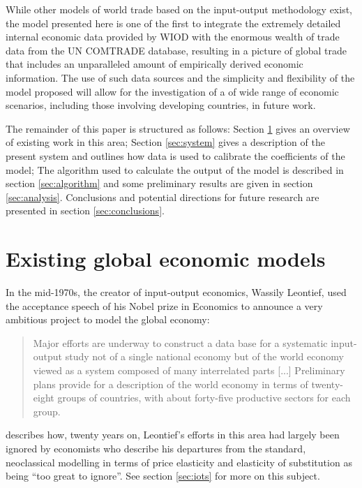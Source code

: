 \documentclass{article}
\begin{document}
While other models of world trade based on the input-output methodology exist, the model presented here is one of the first to integrate the extremely detailed internal economic data provided by WIOD with the enormous wealth of trade data from the UN COMTRADE database, resulting in a picture of global trade that includes an unparalleled amount of empirically derived economic information.
The use of such data sources and the simplicity and flexibility of the model proposed will allow for the investigation of a of wide range of economic scenarios, including those involving developing countries, in future work.

The remainder of this paper is structured as follows: 
Section \ref{sec:litreview} gives an overview of existing work in this area;
Section \ref{sec:system} gives a description of the present system and outlines how data is used to calibrate the coefficients of the model;
The algorithm used to calculate the output of the model is described in section \ref{sec:algorithm} and some preliminary results are given in section \ref{sec:analysis}.
Conclusions and potential directions for future research are presented in section \ref{sec:conclusions}.

\section{Existing global economic models} \label{sec:litreview}
In the mid-1970s, the creator of input-output economics, Wassily Leontief, used the acceptance speech of his Nobel prize in Economics to announce a very ambitious project to model the global economy:

\begin{quotation}
Major efforts are underway to construct a data base for a systematic input-output study not of a single national economy but of the world economy viewed as a system composed of many interrelated parts [...]
Preliminary plans provide for a description of the world economy in terms of twenty-eight groups of countries, with about forty-five productive sectors for each group. 
\end{quotation}

\textcite{duchin_international_2004} describes how, twenty years on, Leontief's efforts in this area had largely been ignored by economists who describe his departures from the standard, neoclassical modelling in terms of price elasticity and elasticity of substitution as being ``too great to ignore''. 
See section \ref{sec:iots} for more on this subject.
\end{document}
